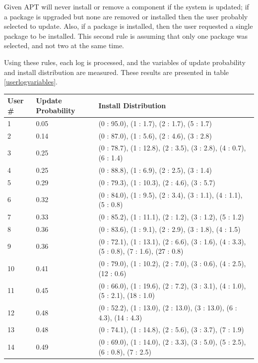 Given APT will never install or remove a component if the system is updated; 
if a package is upgraded but none are removed or installed then the user probably selected to update.
Also, if a package is installed, then the user requested a single package to be installed.
This second rule is assuming that only one package was selected, and not two at the same time.

Using these rules, each log is processed, and the variables of update probability and install distribution are measured.
These results are presented in table \ref{userlogvariables}.

\begin{table}
\begin{tabular}{|l|l ||  p{8.5cm}|}
\hline User \# & Update Probability & Install Distribution  \\ \hline \hline
1  &  0.05	 & 	(0 : 95.0), (1 : 1.7), (2 : 1.7), (5 : 1.7)\\ \hline 
2  &  0.14	 & 	(0 : 87.0), (1 : 5.6), (2 : 4.6), (3 : 2.8)\\ \hline 
3  &  0.25	 & 	(0 : 78.7), (1 : 12.8), (2 : 3.5), (3 : 2.8), (4 : 0.7), (6 : 1.4)\\ \hline 
4  &  0.25	 & 	(0 : 88.8), (1 : 6.9), (2 : 2.5), (3 : 1.4)\\ \hline 
5  &  0.29	 & 	(0 : 79.3), (1 : 10.3), (2 : 4.6), (3 : 5.7)\\ \hline 
6  &  0.32	 & 	(0 : 84.0), (1 : 9.5), (2 : 3.4), (3 : 1.1), (4 : 1.1), (5 : 0.8)\\ \hline 
7  &  0.33	 & 	(0 : 85.2), (1 : 11.1), (2 : 1.2), (3 : 1.2), (5 : 1.2)\\ \hline 
8  &  0.36	 & 	(0 : 83.6), (1 : 9.1), (2 : 2.9), (3 : 1.8), (4 : 1.5)\\ \hline 
9  &  0.36	 & 	(0 : 72.1), (1 : 13.1), (2 : 6.6), (3 : 1.6), (4 : 3.3), (5 : 0.8), (7 : 1.6), (27 : 0.8)\\ \hline 
10  &  0.41	 & 	(0 : 79.0), (1 : 10.2), (2 : 7.0), (3 : 0.6), (4 : 2.5), (12 : 0.6)\\ \hline 
11  &  0.45	 & 	(0 : 66.0), (1 : 19.6), (2 : 7.2), (3 : 3.1), (4 : 1.0), (5 : 2.1), (18 : 1.0)\\ \hline 
12  &  0.48	 & 	(0 : 52.2), (1 : 13.0), (2 : 13.0), (3 : 13.0), (6 : 4.3), (14 : 4.3)\\ \hline 
13  &  0.48	 & 	(0 : 74.1), (1 : 14.8), (2 : 5.6), (3 : 3.7), (7 : 1.9)\\ \hline 
14  &  0.49	 & 	(0 : 69.0), (1 : 14.0), (2 : 3.3), (3 : 5.0), (5 : 2.5), (6 : 0.8), (7 : 2.5)\\ \hline 

\end{tabular}
\end{table}
